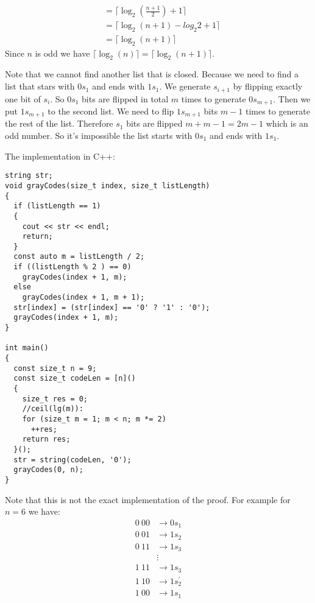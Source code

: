 \documentclass{book}
\begin{document}
\begin{itemize}
\begin{itemize}
\begin{equation*}
\begin{split}
					&= \lceil \log_2{(\frac{n + 1}{2})} + 1 \rceil \\
					&= \lceil \log_2{(n + 1)} - log_2{2} + 1 \rceil \\
					&= \lceil \log_2{(n + 1)} \rceil
				\end{split}
			\end{equation*}
		Since $n$ is odd we have $\lceil \log_2{(n)} \rceil = \lceil \log_2{(n + 1)} \rceil$.
		\par Note that we cannot find another list that is closed. Because we need to find a list that stars with $0s_1$ and ends with $1s_1$. We generate $s_{i + 1}$ by flipping exactly one bit of $s_i$. So $0s_1$ bits are flipped in total $m$ times to generate $0s_{m + 1}$. Then we put $1s_{m + 1}$ to the second list. We need to flip $1s_{m + 1}$ bits $m - 1$ times to generate the rest of the list. Therefore $s_1$ bits are flipped $m + m - 1 = 2m - 1$ which is an odd number. So it's impossible the list starts with $0s_1$ and ends with $1s_1$.
		\end{itemize}
	\end{itemize}
	The implementation in C++:
	\begin{lstlisting}
string str;
void grayCodes(size_t index, size_t listLength)
{
  if (listLength == 1)
  {
    cout << str << endl;
    return;
  }
  const auto m = listLength / 2;
  if ((listLength % 2 ) == 0)
    grayCodes(index + 1, m);
  else
    grayCodes(index + 1, m + 1);
  str[index] = (str[index] == '0' ? '1' : '0');
  grayCodes(index + 1, m);
}

int main()
{
  const size_t n = 9;
  const size_t codeLen = [n]()
  {
    size_t res = 0;
    //ceil(lg(m)):
    for (size_t m = 1; m < n; m *= 2)
      ++res;
    return res;
  }();
  str = string(codeLen, '0');
  grayCodes(0, n);
}
	\end{lstlisting}
	Note that this is not the exact implementation of the proof. For example for $n = 6$ we have:
	\begin{equation*}
		\begin{split}
			0\ 00 &\rightarrow 0s_1 \\
			0\ 01 &\rightarrow 1s_2 \\
			0\ 11 &\rightarrow 1s_3 \\
			&\vdots \\
			1\ 11 &\rightarrow 1s_3 \\
			1\ 10 &\rightarrow 1s_2^{\prime} \\
			1\ 00 &\rightarrow 1s_1 \\			
		\end{split}
	\end{equation*}
\end{document}
